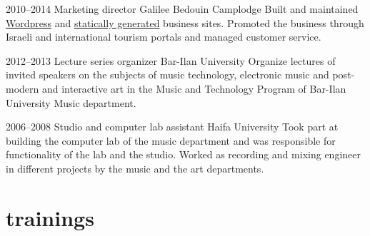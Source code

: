 \documentclass[]{friggeri-cv}  %
\begin{document}
\begin{entrylist}

    \entry
    {2010--2014}
    {Marketing director}
    {Galilee Bedouin Camplodge}
    {Built and maintained \href{http://www.shevet-ahim.co.il/en/}{Wordpress} and \href{http://www.galilee-bedouin-camplodge.com}{statically generated} business sites.
    Promoted the business through Israeli and international tourism portals and managed customer service.}

\end{entrylist}
\begin{entrylist}

    \entry
    {2012--2013}
    {Lecture series organizer}
    {Bar-Ilan University}
    {Organize lectures of invited speakers on the subjects of music technology, electronic music and post-modern and interactive art in the Music and Technology Program of Bar-Ilan University Music department.}

\end{entrylist}
\begin{entrylist}

    \entry
    {2006--2008}
    {Studio and computer lab assistant}
    {Haifa University}
    {Took part at building the computer lab of the music department and was responsible for functionality of the lab and the studio. Worked as recording and mixing engineer in different projects by the music and the art departments.}

\end{entrylist}


\section{trainings}
\end{document}
